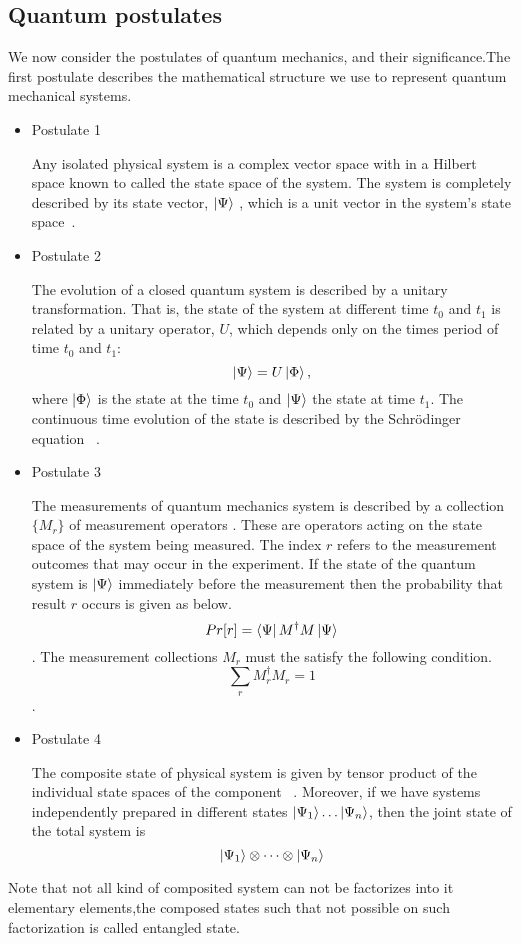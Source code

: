 \subsection{Quantum postulates}\hfill \break
We now consider the postulates of quantum mechanics, and their significance.The first postulate describes the mathematical structure we use to represent quantum mechanical systems.
\begin{itemize}
\item {Postulate 1}

Any isolated physical system is a complex vector space with in a Hilbert space known to called the state space of the system. The system is completely described by its state vector, $\ket{\Psi}$ , which is a unit vector in the system’s state space~\citep{book:17312}.
\item{Postulate 2}

The evolution of a closed quantum system is described by a unitary transformation. That is, the state of the system at different time $t_0$ and $t_1$ is related by a unitary operator, $U$, which depends only on the times period of time $t_0$ and $t_1$:
$$\ket{\Psi}=U\ket{\Phi},$$
where $\ket{\Phi}$ is the state at the time $t_0$ and $\ket{\Psi}$ the state at time $t_1$. The continuous time evolution of the state is described by the Schrödinger equation ~\citep*{book:17312}.
\item{Postulate 3}

The measurements of quantum mechanics system is described by a collection $\{M_r \}$ of measurement operators \citep*{book:17312}. These are operators acting on the state space of the system being
measured. The index $r $ refers to the measurement outcomes that may occur in the experiment. If the state of the quantum system is $\ket{\Psi}$ immediately before the measurement then the probability that result $r$ occurs is given as below.
$$Pr[r]=\bra{\Psi}M^{\dagger} M\ket{\Psi}$$ .
The measurement collections ${M_r }$ must the satisfy the following condition.
$$\sum_r M_{r}^{\dagger} M_r=1$$.


\item{Postulate 4}

The composite state of physical system is given by tensor product of the individual state spaces of the component~\citep{book:889079} . Moreover, if we have systems independently prepared in different states $\ket{\Psi_1} \dots \ket{\Psi_n}$, then the joint state of the total system is
$$\ket{\Psi_1}\otimes\dots \otimes\ket{\Psi_n}$$
\end{itemize}
Note that not all kind of composited system can  not be factorizes into it elementary elements,the composed states  such that not possible on such factorization is called entangled state.
